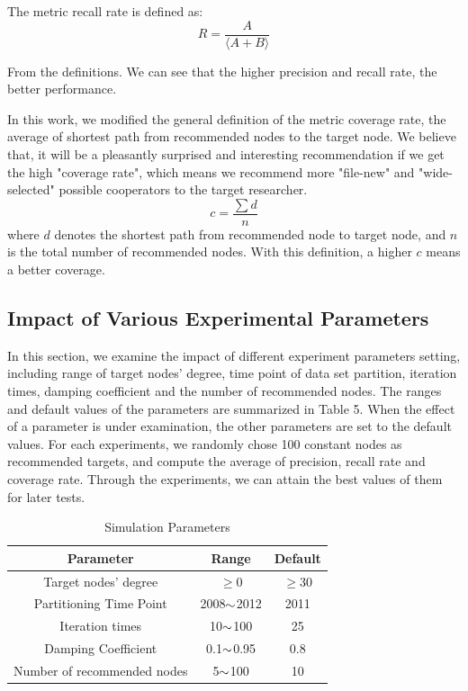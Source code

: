 \documentclass[10pt,journal,compsoc]{IEEEtran}
\begin{document}
The metric recall rate is defined as:
\begin{equation}
R=\frac {A}{\langle A+B \rangle}
\end{equation}

From the definitions. We can see that the higher precision and recall rate, the better performance.

In this work, we modified the general definition of the metric coverage rate, the average of shortest path from recommended nodes to the target node. We believe that, it will be a pleasantly surprised and interesting recommendation if we get the high "coverage rate", which means we recommend more "file-new" and "wide-selected" possible cooperators to the target researcher.
\begin{equation}
c=\frac {\sum d}{n}
\end{equation}
where $d$ denotes the shortest path from recommended node to target node, and $n$ is the total number of recommended nodes. With this definition, a higher $c$ means a better coverage.

\subsection{Impact of Various Experimental Parameters}
In this section, we examine the impact of different experiment parameters setting, including range of target nodes' degree, time point of data set partition, iteration times, damping coefficient and the number of recommended nodes. The ranges and default values of the parameters are summarized in Table 5. When the effect of a parameter is under examination, the other parameters are set to the default values. For each experiments, we randomly chose 100 constant nodes as recommended targets, and compute the average of precision, recall rate and coverage rate. Through the experiments, we can attain the best values of them for later tests.
\begin{table}
\renewcommand{\arraystretch}{1.2}
\centering
\caption{Simulation Parameters}
\begin{tabular}{|c|c|c|}                                                       \hline
Parameter                    & Range                           & Default    \\ \hline
Target nodes' degree         & $\geq 0$           & $\geq 30$          \\ \hline
Partitioning Time Point      & 2008$\scriptsize{\sim}$2012     & 2011       \\ \hline
Iteration times              & 10$\scriptsize{\sim}$100        & 25         \\ \hline
Damping Coefficient          & 0.1$\scriptsize{\sim}$0.95      & 0.8       \\ \hline
Number of recommended nodes  & 5$\scriptsize{\sim}$100         & 10        \\ \hline
\end{tabular}
\end{table}
\end{document}
